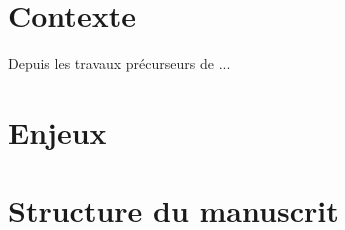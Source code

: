 
\section*{Contexte} %
\label{sec:intro_FR__contexte}

Depuis les travaux précurseurs de \cite[]{Einstein:1905aa} ...

\lipsum[1-2]


\section*{Enjeux} %
\label{sec:intro_FR__enjeux}

\lipsum[1-2]


\section*{Structure du manuscrit} %
\label{sec:intro_FR__structure}

\lipsum[2]


\printbibliography
